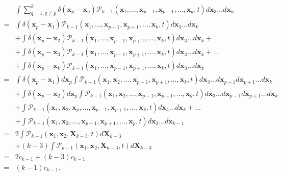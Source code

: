 \begin{subequations} 
\begin{flalign}
 & \int\sum_{q=1,q\neq p}^{k}\delta({\boldsymbol{x}_p-\boldsymbol{x}_q})\mathcal{P}_{k-1}(\boldsymbol{x}_{1},\ldots,\boldsymbol{x}_{p-1},\boldsymbol{x}_{p+1},\ldots,\boldsymbol{x}_{k},t)d\boldsymbol{x}_{3}\ldots d\boldsymbol{x}_{k}\\
= & \int\delta(\boldsymbol{x}_{p}-\boldsymbol{x}_{1})\mathcal{P}_{k-1}(\boldsymbol{x}_{1},\ldots,\boldsymbol{x}_{p-1},\boldsymbol{x}_{p+1},\ldots,\boldsymbol{x}_{k},t)d\boldsymbol{x}_{3}\ldots d\boldsymbol{x}_{k}\\
 & +\int\delta(\boldsymbol{x}_{p}-\boldsymbol{x}_{2})\mathcal{P}_{k-1}(\boldsymbol{x}_{1},\ldots,\boldsymbol{x}_{p-1},\boldsymbol{x}_{p+1},\ldots,\boldsymbol{x}_{k},t)d\boldsymbol{x}_{3}\ldots d\boldsymbol{x}_{k}+\\
 & + \int\delta({\boldsymbol{x}_p-\boldsymbol{x}_3})\mathcal{P}_{k-1}(\boldsymbol{x}_{1},\ldots,\boldsymbol{x}_{p-1},\boldsymbol{x}_{p+1},\ldots,\boldsymbol{x}_{k},t)d\boldsymbol{x}_{3}\ldots d\boldsymbol{x}_{k} + \ldots\\
 &+  \int\delta({\boldsymbol{x}_p-\boldsymbol{x}_k})\mathcal{P}_{k-1}(\boldsymbol{x}_{1},\ldots,\boldsymbol{x}_{p-1},\boldsymbol{x}_{p+1},\ldots,\boldsymbol{x}_{k},t)d\boldsymbol{x}_{3}\ldots d\boldsymbol{x}_{k}\\
= & \int\delta(\boldsymbol{x}_{p}-\boldsymbol{x}_{1})d\boldsymbol{x}_{p}\int\mathcal{P}_{k-1}(\boldsymbol{x}_{1},\boldsymbol{x}_{2},\ldots,\boldsymbol{x}_{p-1},\boldsymbol{x}_{p+1},\ldots,\boldsymbol{x}_{k},t)d\boldsymbol{x}_{3}\ldots d\boldsymbol{x}_{p-1}d\boldsymbol{x}_{p+1}\ldots d\boldsymbol{x}_{k}\\
 & +\int\delta(\boldsymbol{x}_{p}-\boldsymbol{x}_{2})d\boldsymbol{x}_{p}\int\mathcal{P}_{k-1}(\boldsymbol{x}_{1},\boldsymbol{x}_{2},\ldots,\boldsymbol{x}_{p-1},\boldsymbol{x}_{p+1},\ldots,\boldsymbol{x}_{k},t)d\boldsymbol{x}_{3}\ldots d\boldsymbol{x}_{p-1}d\boldsymbol{x}_{p+1}\ldots d\boldsymbol{x}_{k}\\
 & + \int\mathcal{P}_{k-1}(\boldsymbol{x}_{1},\boldsymbol{x}_{2},\boldsymbol{x}_{p},\ldots,\boldsymbol{x}_{p-1},\boldsymbol{x}_{p+1},\ldots,\boldsymbol{x}_{k},t)d\boldsymbol{x}_{4}\ldots d\boldsymbol{x}_{k} + \ldots\\
 &+  \int\mathcal{P}_{k-1}(\boldsymbol{x}_{1},\boldsymbol{x}_{2},\ldots,\boldsymbol{x}_{p-1},\boldsymbol{x}_{p+1},\ldots,\boldsymbol{x}_{p},t)d\boldsymbol{x}_{3}\ldots d\boldsymbol{x}_{k-1}\\
= & 2\int\mathcal{P}_{k-1}(\boldsymbol{x}_{1},\boldsymbol{x}_{2},\boldsymbol{X}_{k-3},t)d\boldsymbol{X}_{k-3}\\
 & +(k-3)\int\mathcal{P}_{k-1}(\boldsymbol{x}_{1},\boldsymbol{x}_{2},\boldsymbol{X}_{k-3},t)d\boldsymbol{X}_{k-3}\label{eq:birth_term_pgeq3_part2}\\
= & 2c_{k-1}+(k-3)c_{k-1}\\
= & (k-1)c_{k-1}.
\end{flalign}
\end{subequations}

